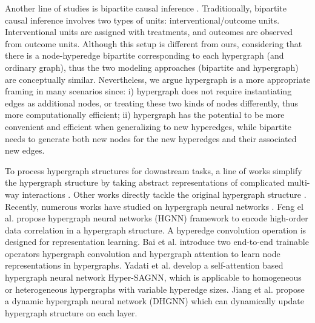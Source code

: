 {
Another line of studies is bipartite causal inference  \cite{zigler2021bipartite,pouget2019variance}. Traditionally, bipartite causal inference involves two types of units: interventional/outcome units. Interventional units are assigned with treatments, and outcomes are observed from outcome units.  
Although this setup is different from ours, considering that there is a node-hyperedge bipartite corresponding to each hypergraph (and ordinary graph), thus %
the two modeling approaches (bipartite and hypergraph) are conceptually similar. Nevertheless, %
we argue hypergraph is a more appropriate framing in many scenarios since: i) hypergraph does not require instantiating edges as additional nodes, or treating these two kinds of nodes differently, thus more computationally efficient; ii) hypergraph has the potential to be more convenient and efficient when generalizing to new hyperedges, while bipartite needs to generate both new nodes for the new hyperedges and their associated new edges.
}

 To process hypergraph structures for downstream tasks, a line of works simplify the hypergraph structure by taking abstract representations of complicated multi-way interactions \cite{benson2018simplicial,li2013link,xu2013hyperlink,yadati2018link,zhang2018beyond}. Other works directly tackle the original hypergraph structure \cite{arya2018exploiting,benson2018sequences,feng2019hypergraph,huang2015scalable,sharma2014predicting,yadati2018hypergcn}.  
Recently, numerous works have studied on hypergraph neural networks \cite{bai2021hypergraph,yadati2018hypergcn}. Feng el al. \cite{feng2019hypergraph} propose hypergraph neural networks (HGNN) framework to encode high-order data correlation in a hypergraph structure. A hyperedge convolution operation is designed for representation learning. Bai et al. \cite{bai2021hypergraph} introduce two end-to-end trainable operators hypergraph convolution and hypergraph attention to learn node representations in hypergraphs. Yadati et al. \cite{yadati2018hypergcn} develop a self-attention based hypergraph neural network Hyper-SAGNN, which is applicable to homogeneous or heterogeneous hypergraphs with variable hyperedge sizes. Jiang et al. \cite{jiang2019dynamic} propose a dynamic hypergraph neural network (DHGNN) which can dynamically update hypergraph structure on each layer. 